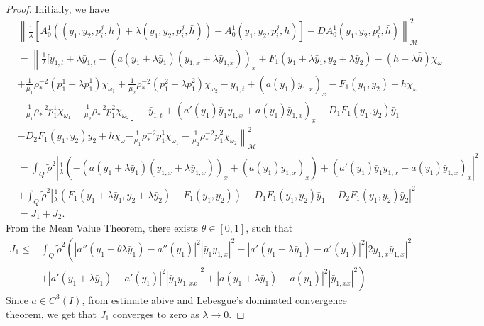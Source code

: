 \documentclass[11pt,a4paper]{amsart}
\numberwithin{equation}{section}
\begin{document}
\begin{proof}
    Initially, we have
    \begin{equation*}		
    	\begin{split}
    		&\left\| \frac{1}{\lambda}\left[ A^1_0 (( y_1, y_2, p_i^j, h)+\lambda(\bar y_1,\bar y_2,\bar p_i^j,\bar h)) - A^1_0( y_1, y_2, p_i^j, h) \right] - D A^1_0(\bar y_1,\bar y_2,\bar p_i^j,\bar h) \right\|^{2}_{\mathcal{M}} \\
    		&=\left\|
    		\frac{1}{\lambda}\Big[ y_{1,t}+\lambda \bar y_{1,t} - \left( a(y_1 + \lambda \bar y_1) (y_{1,x}+\lambda \bar y_{1,x}) \right)_x + F_1(y_1+\lambda \bar y_1, y_2+\lambda \bar y_2)- (h+\lambda \bar h) \chi_{\omega} \right.   \\
    		& \left. \left.    + \frac{1}{\mu_1} \rho_*^{-2} (p^1_1+\lambda \bar p^1_1) \chi_{\omega_1} + \frac{1}{\mu_2} \rho_*^{-2} (p^2_1+\lambda \bar p^2_1) \chi_{\omega_2} -y_{1,t} + \left( a(y_1) y_{1,x} \right)_x - F_1(y_1,y_2) + h \chi_{\omega}   \right. \right.\\
    		& \left. \left.    - \frac{1}{\mu_1} \rho_*^{-2} p^1_1 \chi_{\omega_1} - \frac{1}{\mu_2} \rho_*^{-2} p^2_1 \chi_{\omega_2} \right] -\bar y_{1,t} + (a'(y_{1})\bar y_{1} y_{1,x} +a(y_1) \bar y_{1,x})_x - D_1 F_1(y_1,y_2)\bar y_1 \right.\\
    		&  \left.  - D_2 F_1(y_1,y_2)\bar y_2 + \bar h \chi_{\omega} \right.  \left. -\frac{1}{\mu_1} \rho_*^{-2} \bar p^1_1 \chi_{\omega_{1}} -\frac{1}{\mu_2} \rho_*^{-2} \bar p^2_1 \chi_{\omega_{2}} \right\|^{2}_{\mathcal{M}} \\
    		& = \int_Q \tilde\rho^2 \left| \frac{1}{\lambda}\left( - \left( a(y_1 + \lambda \bar y_1) (y_{1,x}+\lambda \bar y_{1,x}) \right)_x + \left( a(y_1)y_{1,x} \right)_x \right) + (a'(y_{1})\bar y_{1} y_{1,x} +a(y_1) \bar y_{1,x})_x \right|^2 \\
            & + \int_Q \tilde\rho^2 \left| \frac{1}{\lambda}( F_1(y_1+\lambda\bar y_1,y_2 + \lambda\bar y_2) - F_1(y_1,y_2)) - D_1 F_1(y_1,y_2)\bar y_1 - D_2 F_1(y_1,y_2)\bar y_2 \right|^2 \\
            &= J_1+J_2.
    	\end{split}
    \end{equation*}From the Mean Value Theorem, there exists $\theta \in [0,1]$, such that
    \begin{equation*}
        \begin{split}
            J_1 \leq &\int_Q \tilde\rho^2 \left( \left| a''(y_1 + \theta \lambda \bar y_1) - a''(y_1) \right|^2 |\bar y_1 y_{1,x} |^2 - \left| a'(y_1 + \lambda \bar y_1)-a'(y_1) \right|^2 \left| 2 y_{1,x} \bar y_{1,x} \right|^2 \right.\\
            &\left.  + \left| a'(y_1+\lambda\bar y_1)-a'(y_1) \right|^2 |\bar y_1 y_{1,xx}|^2 + |a(y_1+\lambda\bar y_1)-a(y_1)|^2 |\bar y_{1,xx}|^2 \right) 
        \end{split}
    \end{equation*}Since $a \in C^3(I)$,  from estimate abive and Lebesgue's dominated convergence theorem, we get that $J_1$ converges to zero as $\lambda \to 0$.
    

\end{proof}
\end{document}
